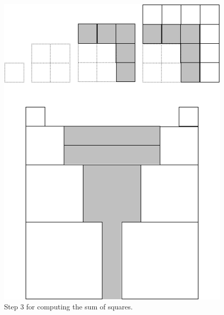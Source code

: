 \begin{figure}[ht]
\begin{center}
       \includegraphics[scale=0.4]{FiguresMaths/SumSquares4}
\caption{Step 3 for computing the sum of squares.}
       \label{fig:sumSquares4}
\end{center}
\end{figure}

